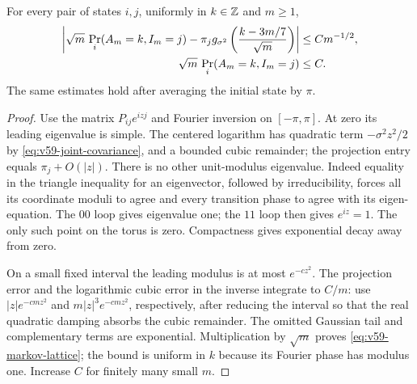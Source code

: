 \begin{lemma}
\label{lem:v59-markov-lattice}
For every pair of states $i,j$, uniformly in $k\in\mathbb Z$ and $m\ge1$,
\begin{align}
 \left|\sqrt m\,\Pr_i(A_m=k,I_m=j)
       -\pi_jg_{\sigma^2}\left(\frac{k-3m/7}{\sqrt m}\right)\right|
                &\le C m^{-1/2},\label{eq:v59-markov-lattice}\\
 \sqrt m\,\Pr_i(A_m=k,I_m=j)&\le C.\notag
\end{align}
The same estimates hold after averaging the initial state by $\pi$.
\end{lemma}
\begin{proof}
Use the matrix $P_{ij}e^{izj}$ and Fourier inversion on $[-\pi,\pi]$.
At zero its leading eigenvalue is simple. The centered logarithm has
quadratic term $-\sigma^2z^2/2$ by
\eqref{eq:v59-joint-covariance}, and a bounded cubic remainder; the
projection entry equals $\pi_j+O(|z|)$.
There is no other unit-modulus eigenvalue. Indeed equality in the
triangle inequality for an eigenvector, followed by irreducibility,
forces all its coordinate moduli to agree and every transition phase
to agree with its eigen-equation. The $00$ loop gives eigenvalue one;
the $11$ loop then gives $e^{iz}=1$. The only such point on the torus
is zero. Compactness gives exponential decay away from zero.

On a small fixed interval the leading modulus is at most $e^{-cz^2}$.
The projection error and the logarithmic cubic error in the inverse
integrate to $C/m$: use $|z|e^{-cmz^2}$ and
$m|z|^3e^{-cmz^2}$, respectively, after reducing the interval so that
the real quadratic damping absorbs the cubic remainder. The omitted
Gaussian tail and complementary terms are exponential. Multiplication
by $\sqrt m$ proves \eqref{eq:v59-markov-lattice}; the bound is uniform
in $k$ because its Fourier phase has modulus one. Increase $C$ for
finitely many small $m$.
\end{proof}

